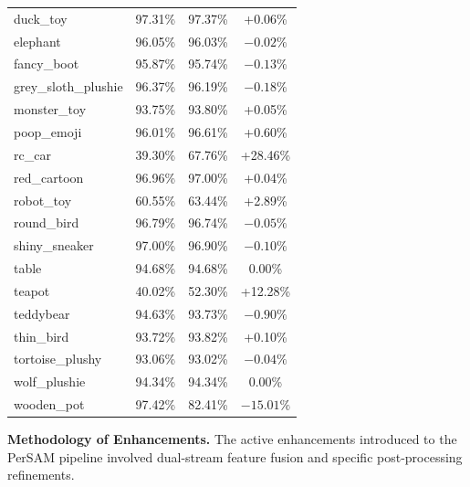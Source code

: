 \documentclass[journal,12pt,onecolumn,draftclsnofoot]{IEEEtran}
\begin{document}
\begin{longtable}{l c c c}
duck\_toy & 97.31\% & 97.37\% & +0.06\% \\
elephant & 96.05\% & 96.03\% & $-0.02\%$ \\
fancy\_boot & 95.87\% & 95.74\% & $-0.13\%$ \\
grey\_sloth\_plushie & 96.37\% & 96.19\% & $-0.18\%$ \\
monster\_toy & 93.75\% & 93.80\% & +0.05\% \\
poop\_emoji & 96.01\% & 96.61\% & +0.60\% \\
rc\_car & 39.30\% & 67.76\% & +28.46\% \\
red\_cartoon & 96.96\% & 97.00\% & +0.04\% \\
robot\_toy & 60.55\% & 63.44\% & +2.89\% \\
round\_bird & 96.79\% & 96.74\% & $-0.05\%$ \\
shiny\_sneaker & 97.00\% & 96.90\% & $-0.10\%$ \\
table & 94.68\% & 94.68\% & 0.00\% \\
teapot & 40.02\% & 52.30\% & +12.28\% \\
teddybear & 94.63\% & 93.73\% & $-0.90\%$ \\
thin\_bird & 93.72\% & 93.82\% & +0.10\% \\
tortoise\_plushy & 93.06\% & 93.02\% & $-0.04\%$ \\
wolf\_plushie & 94.34\% & 94.34\% & 0.00\% \\
wooden\_pot & 97.42\% & 82.41\% & $-15.01\%$ \\
\end{longtable}
\normalsize

\textbf{Methodology of Enhancements.} The active enhancements introduced to the PerSAM pipeline involved dual-stream feature fusion and specific post-processing refinements.
\end{document}
